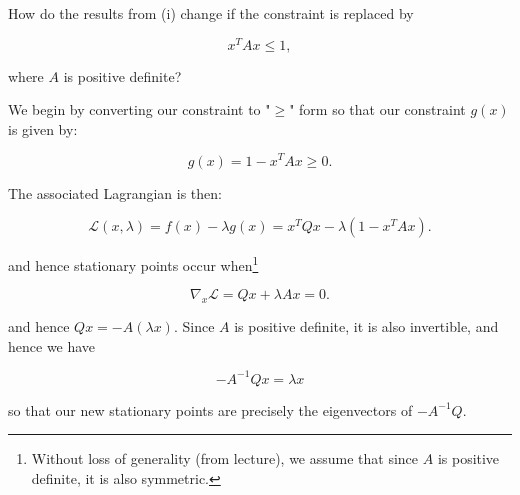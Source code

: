 How do the results from (i) change if the constraint is replaced by

$$
x^T A x \le 1,
$$

where $A$ is positive definite?

\begin{solution}
    We begin by converting our constraint to "$\ge$" form so that our constraint $g(x)$ is given by:

    $$
    g(x) = 1 - x^T A x \ge 0.
    $$

    The associated Lagrangian is then:

    $$
    \mathcal{L}(x, \lambda) = f(x) - \lambda g(x) = x^T Q x - \lambda (1 - x^T A x).
    $$

    and hence stationary points occur when\footnote{
        Without loss of generality (from lecture), we assume that since $A$ is positive definite, it is also symmetric. 
    }
    
    $$
    \nabla_x \mathcal{L} = Q x + \lambda A x = 0.
    $$

    and hence $Qx = -A (\lambda x)$. Since $A$ is positive definite, it is also invertible, and hence we have

    $$
    -A^{-1} Q x = \lambda x
    $$

    so that our new stationary points are precisely the eigenvectors of $-A^{-1} Q$.
    \ \\
    \vfill
\end{solution}